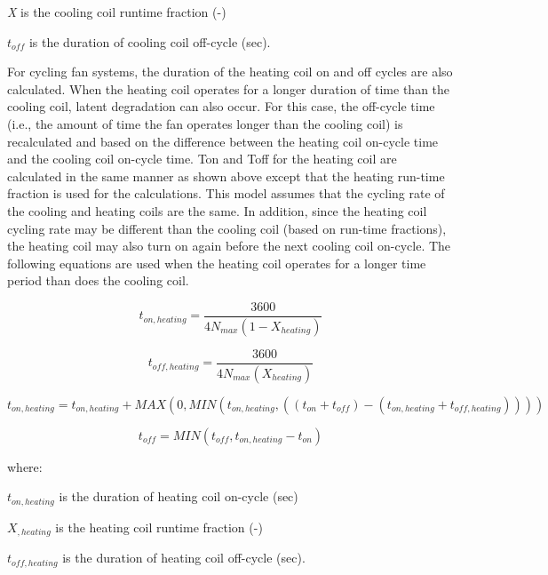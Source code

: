 \emph{X} is the cooling coil runtime fraction (-)

\(t_{off}\) is the duration of cooling coil off-cycle (sec).

For cycling fan systems, the duration of the heating coil on and off cycles are also calculated. When the heating coil operates for a longer duration of time than the cooling coil, latent degradation can also occur. For this case, the off-cycle time (i.e., the amount of time the fan operates longer than the cooling coil) is recalculated and based on the difference between the heating coil on-cycle time and the cooling coil on-cycle time. Ton and Toff for the heating coil are calculated in the same manner as shown above except that the heating run-time fraction is used for the calculations. This model assumes that the cycling rate of the cooling and heating coils are the same. In addition, since the heating coil cycling rate may be different than the cooling coil (based on run-time fractions), the heating coil may also turn on again before the next cooling coil on-cycle. The following equations are used when the heating coil operates for a longer time period than does the cooling coil.

\begin{equation}
t_{on,heating} = \frac{{3600}}{{4N_{max}\left( {1 - X_{heating}} \right)}}
\end{equation}

\begin{equation}
t_{off,heating} = \frac{{3600}}{{4N_{max}\left( {X_{heating}} \right)}}
\end{equation}

{\scriptsize
\begin{equation}
t_{on,heating} = t_{on,heating} + MAX\left( {0,MIN\left( {t_{on,heating},\left( {\left( {t_{on} + t_{off}} \right) - \left( {t_{on,heating} + t_{off,heating}} \right)} \right)} \right)} \right)
\end{equation}}

\begin{equation}
t_{off} = MIN\left( {t_{off},t_{on,heating} - t_{on}} \right)
\end{equation}

where:

\(t_{on,heating}\) is the duration of heating coil on-cycle (sec)

\(X_{,heating}\) is the heating coil runtime fraction (-)

\(t_{off,heating}\) is the duration of heating coil off-cycle (sec).

